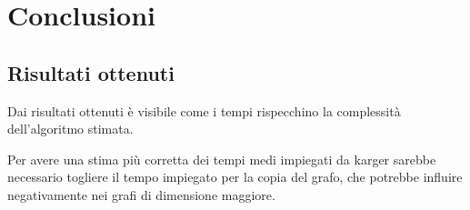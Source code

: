 \chapter{Conclusioni\label{sec:conclusioni}}

\section{Risultati ottenuti\label{sec:risultati-ottenuti}}
Dai risultati ottenuti è visibile come i tempi rispecchino la complessità dell'algoritmo stimata.

Per avere una stima più corretta dei tempi medi impiegati da karger sarebbe necessario togliere il tempo impiegato per la copia del grafo, che potrebbe influire negativamente nei grafi di dimensione maggiore.